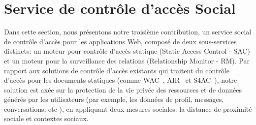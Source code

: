 \documentclass[a4paper]{article}
\begin{document}
\section{Service de contrôle d'accès Social}
\label{ch:ac}
Dans cette section, nous présentons notre troisième contribution, un service social de contrôle d'accès pour les applications Web, composé de deux sous-services distincts: un moteur pour contrôle d'accès statique (Static Access Control - SAC) et un moteur pour la surveillance des relations (Relationship Monitor - RM). Par rapport aux solutions de contrôle d'accès existants qui traitent du contrôle d'accès pour les documents statiques (comme WAC~\cite{hollenbach2009using}, AIR~\cite{kagal2011gasping} et S4AC~\cite{villata2011social}), notre solution est axée sur la protection de la vie privée des ressources et de données générés par les utilisateurs (par exemple, les données de profil, messages, conversations, etc ), en appliquant deux mesures sociales: la distance de proximité sociale et contextes sociaux.\\
\end{document}
